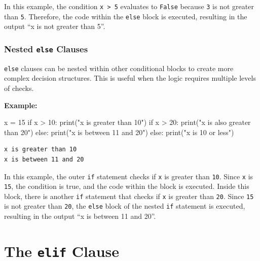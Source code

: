 \documentclass[
  letterpaper,
  DIV=11,
  numbers=noendperiod]{scrreprt}
\newenvironment{Shaded}{\begin{snugshade}}{\end{snugshade}}
\newcommand{\BuiltInTok}[1]{\textcolor[rgb]{0.00,0.23,0.31}{#1}}
\newcommand{\ControlFlowTok}[1]{\textcolor[rgb]{0.00,0.23,0.31}{#1}}
\newcommand{\DecValTok}[1]{\textcolor[rgb]{0.68,0.00,0.00}{#1}}
\newcommand{\NormalTok}[1]{\textcolor[rgb]{0.00,0.23,0.31}{#1}}
\newcommand{\OperatorTok}[1]{\textcolor[rgb]{0.37,0.37,0.37}{#1}}
\newcommand{\StringTok}[1]{\textcolor[rgb]{0.13,0.47,0.30}{#1}}
\begin{document}
In this example, the condition \texttt{x\ \textgreater{}\ 5} evaluates
to \texttt{False} because \texttt{3} is not greater than \texttt{5}.
Therefore, the code within the \texttt{else} block is executed,
resulting in the output ``x is not greater than 5''.

\hypertarget{nested-else-clauses}{%
\subsubsection{\texorpdfstring{Nested \texttt{else}
Clauses}{Nested else Clauses}}\label{nested-else-clauses}}

\texttt{else} clauses can be nested within other conditional blocks to
create more complex decision structures. This is useful when the logic
requires multiple levels of checks.

\textbf{Example:}

\begin{Shaded}
\begin{Highlighting}[]
\NormalTok{x }\OperatorTok{=} \DecValTok{15}
\ControlFlowTok{if}\NormalTok{ x }\OperatorTok{\textgreater{}} \DecValTok{10}\NormalTok{:}
    \BuiltInTok{print}\NormalTok{(}\StringTok{"x is greater than 10"}\NormalTok{)}
    \ControlFlowTok{if}\NormalTok{ x }\OperatorTok{\textgreater{}} \DecValTok{20}\NormalTok{:}
        \BuiltInTok{print}\NormalTok{(}\StringTok{"x is also greater than 20"}\NormalTok{)}
    \ControlFlowTok{else}\NormalTok{:}
        \BuiltInTok{print}\NormalTok{(}\StringTok{"x is between 11 and 20"}\NormalTok{)}
\ControlFlowTok{else}\NormalTok{:}
    \BuiltInTok{print}\NormalTok{(}\StringTok{"x is 10 or less"}\NormalTok{)}
\end{Highlighting}
\end{Shaded}

\begin{verbatim}
x is greater than 10
x is between 11 and 20
\end{verbatim}

In this example, the outer \texttt{if} statement checks if \texttt{x} is
greater than \texttt{10}. Since \texttt{x} is \texttt{15}, the condition
is true, and the code within the block is executed. Inside this block,
there is another \texttt{if} statement that checks if \texttt{x} is
greater than \texttt{20}. Since \texttt{15} is not greater than
\texttt{20}, the \texttt{else} block of the nested \texttt{if} statement
is executed, resulting in the output ``x is between 11 and 20''.

\hypertarget{the-elif-clause}{%
\section{\texorpdfstring{The \texttt{elif}
Clause}{The elif Clause}}\label{the-elif-clause}}
\end{document}
